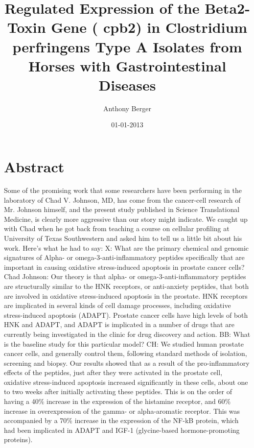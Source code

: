 \documentclass{article}%
\title{Regulated Expression of the Beta2{-}Toxin Gene ( cpb2) in Clostridium perfringens Type A Isolates from Horses with Gastrointestinal Diseases}%
\author{Anthony Berger}%
\affil{School of Biosciences, University of Birmingham, Edgbaston, Birmingham B15 2TT, UK}%
\date{01{-}01{-}2013}%
\begin{document}
%
\normalsize%
\maketitle%
\section{Abstract}%
\label{sec:Abstract}%
Some of the promising work that some researchers have been performing in the laboratory of Chad V. Johnson, MD, has come from the cancer{-}cell research of Mr. Johnson himself, and the present study published in Science Translational Medicine, is clearly more aggressive than our story might indicate. We caught up with Chad when he got back from teaching a course on cellular profiling at University of Texas Southwestern and asked him to tell us a little bit about his work. Here's what he had to say:\newline%
X: What are the primary chemical and genomic signatures of Alpha{-} or omega{-}3{-}anti{-}inflammatory peptides specifically that are important in causing oxidative stress{-}induced apoptosis in prostate cancer cells?\newline%
Chad Johnson: Our theory is that alpha{-} or omega{-}3{-}anti{-}inflammatory peptides are structurally similar to the HNK receptors, or anti{-}anxiety peptides, that both are involved in oxidative stress{-}induced apoptosis in the prostate. HNK receptors are implicated in several kinds of cell damage processes, including oxidative stress{-}induced apoptosis (ADAPT). Prostate cancer cells have high levels of both HNK and ADAPT, and ADAPT is implicated in a number of drugs that are currently being investigated in the clinic for drug discovery and action.\newline%
BB: What is the baseline study for this particular model?\newline%
CH: We studied human prostate cancer cells, and generally control them, following standard methods of isolation, screening and biopsy. Our results showed that as a result of the pro{-}inflammatory effects of the peptides, just after they were activated in the prostate cell, oxidative stress{-}induced apoptosis increased significantly in these cells, about one to two weeks after initially activating these peptides. This is on the order of having a 40\% increase in the expression of the histamine receptor, and 60\% increase in overexpression of the gamma{-} or alpha{-}aromatic receptor. This was accompanied by a 70\% increase in the expression of the NF{-}kB protein, which had been implicated in ADAPT and IGF{-}1 (glycine{-}based hormone{-}promoting proteins).\newline%
\end{document}
